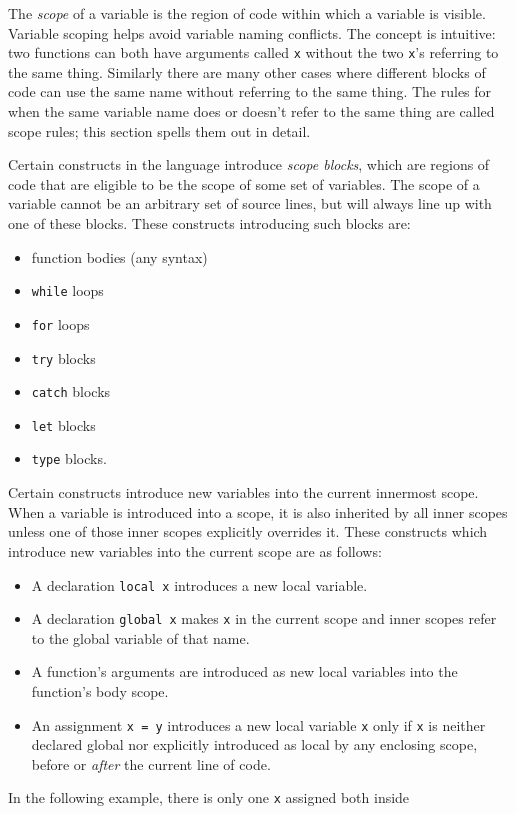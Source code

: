 \documentclass{article}
\begin{document}
The \emph{scope} of a variable is the region of code within which a variable
is visible.
Variable scoping helps avoid variable naming conflicts.
The concept is intuitive:
two functions can both have arguments called \verb|x| without the two \verb|x|'s referring to the same thing.
Similarly there are many other cases where different blocks of code can use the same name without referring to the same thing.
The rules for when the same variable name does or doesn't refer to the same thing are called scope rules;
this section spells them out in detail.

Certain constructs in the language introduce \emph{scope blocks}, which
are regions of code that are eligible to be the scope of some set of variables.
The scope of a variable cannot be an arbitrary set of
source lines, but will always line up with one of these blocks. These
constructs introducing such blocks are:
\begin{itemize}
\item function bodies (any syntax)
\item \verb|while| loops
\item \verb|for| loops
\item \verb|try| blocks
\item \verb|catch| blocks
\item \verb|let| blocks
\item \verb|type| blocks.
\end{itemize}
Certain constructs introduce new variables into the current innermost scope. When
a variable is introduced into a scope, it is also inherited by all inner
scopes unless one of those inner scopes explicitly overrides it. These
constructs which introduce new variables into the current scope are as follows:
\begin{itemize}
\item A declaration \verb|local x| introduces a new local variable.
\item A declaration \verb|global x| makes \verb|x| in the current scope
and inner scopes refer to the global variable of that name.
\item A function's arguments are introduced as new local variables into the
function's body scope.
\item An assignment \verb|x = y| introduces a new local variable \verb|x|
only if \verb|x| is neither declared global nor explicitly introduced as local
by any enclosing scope, before or \emph{after} the current line of code.
\end{itemize}
In the following example, there is only one \verb|x| assigned both inside
\end{document}
